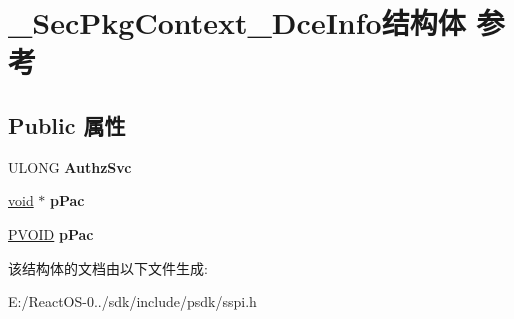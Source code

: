 \hypertarget{struct___sec_pkg_context___dce_info}{}\section{\+\_\+\+Sec\+Pkg\+Context\+\_\+\+Dce\+Info结构体 参考}
\label{struct___sec_pkg_context___dce_info}
\subsection*{Public 属性}
\begin{DoxyCompactItemize}
\item 
\mbox{\label{struct___sec_pkg_context___dce_info_a0077e1d27b197a8f95638ba964ee2d2c}} 
U\+L\+O\+NG {\bfseries Authz\+Svc}
\item 
\mbox{\label{struct___sec_pkg_context___dce_info_a80fed72b17681c42082261cd559104a3}} 
\hyperlink{interfacevoid}{void} $\ast$ {\bfseries p\+Pac}
\item 
\mbox{\label{struct___sec_pkg_context___dce_info_addb355d067ace09ec400e37388ebdcdd}} 
\hyperlink{interfacevoid}{P\+V\+O\+ID} {\bfseries p\+Pac}
\end{DoxyCompactItemize}


该结构体的文档由以下文件生成\+:\begin{DoxyCompactItemize}
\item 
E\+:/\+React\+O\+S-\/0../sdk/include/psdk/sspi.\+h\end{DoxyCompactItemize}
